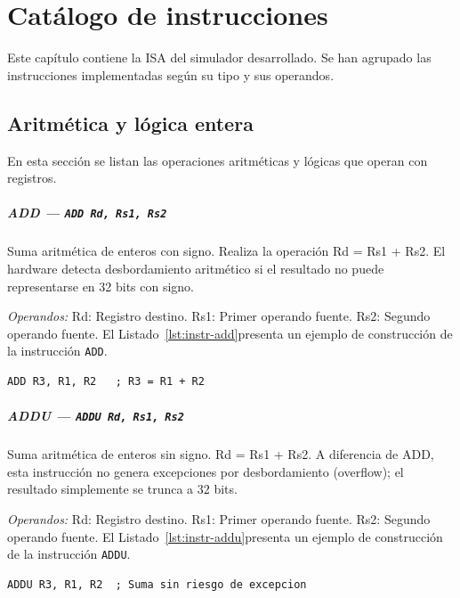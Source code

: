 \documentclass[../main.tex]{subfiles}
\begin{document}
\chapter{Catálogo de instrucciones}
\label{C:catalogo}
\lstset{style=asgardstyle}

Este capítulo contiene la ISA del simulador desarrollado. Se han agrupado las instrucciones implementadas según su tipo y sus operandos.

\section{Aritmética y lógica entera}

En esta sección se listan las operaciones aritméticas y lógicas que operan con registros.

\paragraph*{ADD --- \texttt{ADD Rd, Rs1, Rs2}}
Suma aritmética de enteros con signo. Realiza la operación Rd = Rs1 + Rs2. El hardware detecta desbordamiento aritmético si el resultado no puede representarse en 32 bits con signo.

\textit{Operandos:} Rd: Registro destino. Rs1: Primer operando fuente. Rs2: Segundo operando fuente.
El Listado~\ref{lst:instr-add}presenta un ejemplo de construcción de la instrucción \texttt{ADD}.

\begin{lstlisting}[caption={ADD},label={lst:instr-add}]
	ADD R3, R1, R2   ; R3 = R1 + R2
\end{lstlisting}

\paragraph*{ADDU --- \texttt{ADDU Rd, Rs1, Rs2}}
Suma aritmética de enteros sin signo. Rd = Rs1 + Rs2. A diferencia de ADD, esta instrucción no genera excepciones por desbordamiento (overflow); el resultado simplemente se trunca a 32 bits.

\textit{Operandos:} Rd: Registro destino. Rs1: Primer operando fuente. Rs2: Segundo operando fuente.
El Listado~\ref{lst:instr-addu}presenta un ejemplo de construcción de la instrucción \texttt{ADDU}.

\begin{lstlisting}[caption={ADDU},label={lst:instr-addu}]
	ADDU R3, R1, R2  ; Suma sin riesgo de excepcion
\end{lstlisting}
\end{document}
